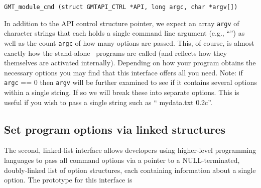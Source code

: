 \documentclass{report}
\begin{document}
\begin{verbatim}
GMT_module_cmd (struct GMTAPI_CTRL *API, long argc, char *argv[])
\end{verbatim}
In addition to the API control structure pointer, we expect an array \texttt{argv} of character strings that each
holds a single command line argument (e.g., ``'') as well as the count \texttt{argc}
of how many options are passed.  This, of course, is almost exactly how the stand-alone \GMT\
programs are called (and reflects how they themselves are activated internally).  Depending on how
your program obtains the necessary options you may find that this interface offers all you need.
Note: if \texttt{argc} == 0 then \texttt{argv} will be further examined to see if it contains several options within a single string.
If so we will break these into separate options.  This is useful if you wish to pass a single string such as
``\Opt{R}{\it 120:30/134:45/8S/3N} \Opt{JM}{\it 6i} mydata.txt \Opt{Sc}0.2c''.

\subsection{Set program options via linked structures}

The second, linked-list interface allows developers using higher-level programming languages to pass all command
options via a pointer to a NULL-terminated, doubly-linked list of option structures, each containing
information about a single option.  The prototype for this interface is
\end{document}
